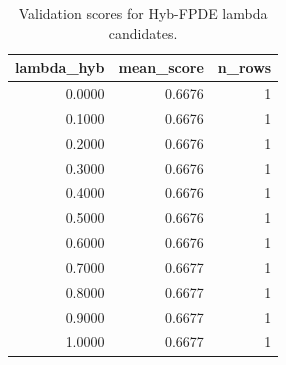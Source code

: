 \begin{table}[t]
\caption{Validation scores for Hyb-FPDE lambda candidates.}
\label{tab:lambda_distribution_computed}
\centering
\begin{tabular}{rrr}
\toprule
lambda\_hyb & mean\_score & n\_rows \\
\midrule
0.0000 & 0.6676 & 1 \\
0.1000 & 0.6676 & 1 \\
0.2000 & 0.6676 & 1 \\
0.3000 & 0.6676 & 1 \\
0.4000 & 0.6676 & 1 \\
0.5000 & 0.6676 & 1 \\
0.6000 & 0.6676 & 1 \\
0.7000 & 0.6677 & 1 \\
0.8000 & 0.6677 & 1 \\
0.9000 & 0.6677 & 1 \\
1.0000 & 0.6677 & 1 \\
\bottomrule
\end{tabular}

\end{table}
